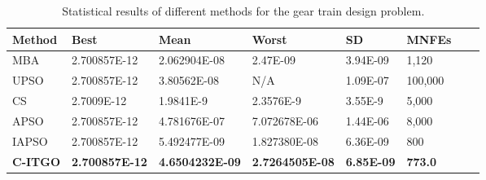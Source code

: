 
\begin{table*}[h]
    \tiny
\begin{center}

\begin{tabular}{ P{2.0cm} P{2.0cm} P{2.0cm} P{2.0cm} P{2.0cm} P{2.0cm} P{2.0cm} P{2.0cm}  }
\hline
\textbf{Method} & \textbf{Best} & \textbf{Mean} & \textbf{Worst} & \textbf{SD} & \textbf{MNFEs} \\
\hline

MBA & 2.700857E-12 & 2.062904E-08 & 2.47E-09 & 3.94E-09 & 1,120 \\
UPSO & 2.700857E-12 & 3.80562E-08 & N/A & 1.09E-07 & 100,000 \\
CS & 2.7009E-12 & 1.9841E-9 & 2.3576E-9 & 3.55E-9 & 5,000 \\
APSO & 2.700857E-12 & 4.781676E-07 & 7.072678E-06 & 1.44E-06 & 8,000 \\
IAPSO & 2.700857E-12 & 5.492477E-09 & 1.827380E-08 & 6.36E-09 & 800 \\
\textbf{C-ITGO} & \bf{2.700857E-12} & \bf{4.6504232E-09} & \bf{2.7264505E-08} & \bf{6.85E-09} & \bf{773.0} \\


\hline
\end{tabular}
\end{center}
\vspace*{-6mm}
\caption{Statistical results of different methods for the gear train design problem. \\[1em]}
\label{tab:GT}
\end{table*}

